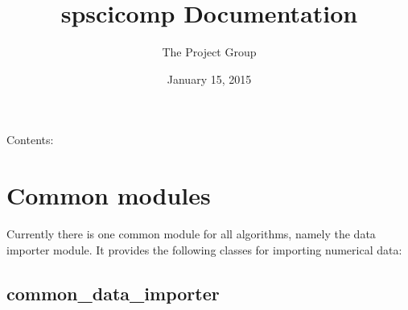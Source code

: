 \documentclass[letterpaper,10pt,english]{sphinxmanual}
\title{spscicomp Documentation}
\date{January 15, 2015}
\author{The Project Group}
\begin{document}
\maketitle
\tableofcontents
{}\label{index::doc}


Contents:


\chapter{Common modules}
\label{common:welcome-to-spscicomp-s-documentation}\label{common::doc}\label{common:common-modules}
Currently there is one common module for all algorithms, namely the data importer module. It provides the following classes for importing numerical data:


\section{common\_data\_importer}
\label{common:common-data-importer}\label{common:module-common_data_importer}
\end{document}

